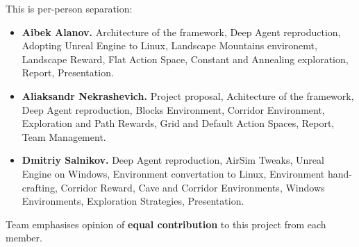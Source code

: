 \documentclass{article}
\begin{document}
This is per-person separation:

\begin{itemize}
    \item {\bf Aibek Alanov.} Architecture of the framework, Deep Agent reproduction,
        Adopting Unreal Engine to Linux, Landscape Mountains environemt,
        Landscape Reward, Flat Action Space, Constant and Annealing exploration,
        Report, Presentation.

    \item {\bf Aliaksandr Nekrashevich.} Project proposal, Achitecture of
        the framework, Deep Agent reproduction, Blocks Environment,
        Corridor Environment, Exploration and Path Rewards,
        Grid and Default Action Spaces, Report, Team Management.

    \item {\bf Dmitriy Salnikov.} Deep Agent reproduction, AirSim Tweaks,
        Unreal Engine on Windows, Environment convertation to Linux,
        Environment hand-crafting, Corridor Reward, Cave and Corridor
        Environments, Windows Environments, Exploration Strategies,
        Presentation.
\end{itemize}

Team emphasises opinion of {\bf equal contribution} to this project from
each member.



\end{document}
